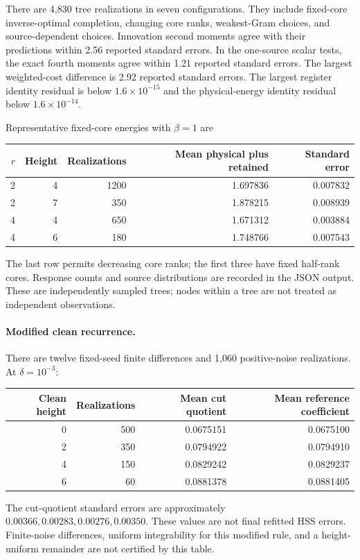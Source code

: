 \documentclass[11pt,oneside,openany,a4paper]{book}
\numberwithin{equation}{chapter}
\theoremstyle{definition}
\theoremstyle{remark}
\begin{document}
There are 4,830 tree realizations in seven configurations. They include fixed-core inverse-optimal completion, changing core ranks, weakest-Gram choices, and source-dependent choices. Innovation second moments agree with their predictions within 2.56 reported standard errors. In the one-source scalar tests, the exact fourth moments agree within 1.21 reported standard errors. The largest weighted-cost difference is 2.92 reported standard errors. The largest register identity residual is below $1.6\times10^{-15}$ and the physical-energy identity residual below $1.6\times10^{-14}$.

Representative fixed-core energies with $\beta=1$ are
\begin{center}
\begin{tabular}{rrrrr}
\toprule $r$ & Height & Realizations & Mean physical plus retained & Standard error\\\midrule
2&4&1200&1.697836&0.007832\\
2&7&350&1.878215&0.008939\\
4&4&650&1.671312&0.003884\\
4&6&180&1.748766&0.007543\\\bottomrule
\end{tabular}
\end{center}
The last row permits decreasing core ranks; the first three have fixed half-rank cores. Response counts and source distributions are recorded in the JSON output. These are independently sampled trees; nodes within a tree are not treated as independent observations.

\paragraph{Modified clean recurrence.}
There are twelve fixed-seed finite differences and 1,060 positive-noise realizations. At $\delta=10^{-3}$:
\begin{center}
\begin{tabular}{rrrr}
\toprule Clean height & Realizations & Mean cut quotient & Mean reference coefficient\\\midrule
0&500&0.0675151&0.0675100\\
2&350&0.0794922&0.0794910\\
4&150&0.0829242&0.0829237\\
6&60&0.0881378&0.0881405\\\bottomrule
\end{tabular}
\end{center}
The cut-quotient standard errors are approximately $0.00366,0.00283,0.00276,0.00350$. These values are not final refitted HSS errors. Finite-noise differences, uniform integrability for this modified rule, and a height-uniform remainder are not certified by this table.
\end{document}
